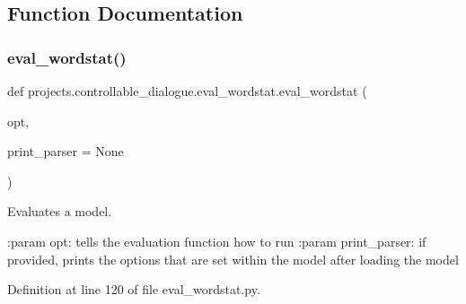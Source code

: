 \subsection{Function Documentation}
\mbox{\label{namespaceprojects_1_1controllable__dialogue_1_1eval__wordstat_aa89fea1e83d255fa77e81e73a7d81161}} 
\subsubsection{\texorpdfstring{eval\+\_\+wordstat()}{eval\_wordstat()}}
{\footnotesize\ttfamily def projects.\+controllable\+\_\+dialogue.\+eval\+\_\+wordstat.\+eval\+\_\+wordstat (\begin{DoxyParamCaption}\item[{}]{opt,  }\item[{}]{print\+\_\+parser = {\ttfamily None} }\end{DoxyParamCaption})}

\begin{DoxyVerb}Evaluates a model.

:param opt: tells the evaluation function how to run
:param print_parser: if provided, prints the options that are set within the
    model after loading the model
\end{DoxyVerb}
 

Definition at line 120 of file eval\+\_\+wordstat.\+py.


